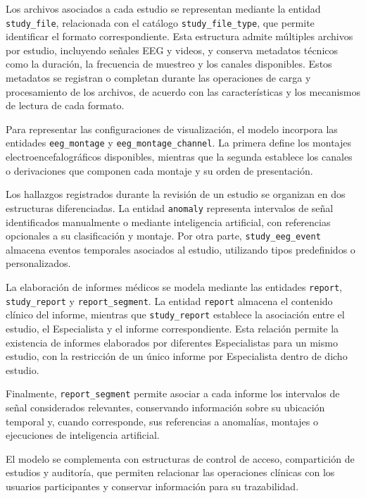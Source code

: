 Los archivos asociados a cada estudio se representan mediante la entidad
\texttt{study\_file}, relacionada con el catálogo
\texttt{study\_file\_type}, que permite identificar el formato
correspondiente. Esta estructura admite múltiples archivos por estudio,
incluyendo señales EEG y videos, y conserva metadatos técnicos como la
duración, la frecuencia de muestreo y los canales disponibles.
Estos metadatos se registran o completan durante las operaciones de carga
y procesamiento de los archivos, de acuerdo con las características y
los mecanismos de lectura de cada formato.

Para representar las configuraciones de visualización,
el modelo incorpora las entidades \texttt{eeg\_montage}
y \texttt{eeg\_montage\_channel}. La primera define los
montajes electroencefalográficos disponibles, mientras
que la segunda establece los canales o derivaciones
que componen cada montaje y su orden de presentación.

Los hallazgos registrados durante la revisión de un
estudio se organizan en dos estructuras diferenciadas.
La entidad \texttt{anomaly} representa intervalos de
señal identificados manualmente o mediante inteligencia
artificial, con referencias opcionales a su clasificación
y montaje. Por otra parte, \texttt{study\_eeg\_event}
almacena eventos temporales asociados al estudio,
utilizando tipos predefinidos o personalizados.


La elaboración de informes médicos se modela mediante las entidades \texttt{report}, \texttt{study\_report} y \texttt{report\_segment}. La entidad \texttt{report} almacena el contenido clínico del informe, mientras que \texttt{study\_report} establece la asociación entre el estudio, el Especialista y el informe correspondiente. Esta relación permite la existencia de informes elaborados por diferentes Especialistas para un mismo estudio, con la restricción de un único informe por Especialista dentro de dicho estudio.


Finalmente, \texttt{report\_segment} permite asociar
a cada informe los intervalos de señal considerados
relevantes, conservando información sobre su ubicación
temporal y, cuando corresponde, sus referencias a
anomalías, montajes o ejecuciones de inteligencia
artificial.

El modelo se complementa con estructuras de control
de acceso, compartición de estudios y auditoría,
que permiten relacionar las operaciones clínicas con
los usuarios participantes y conservar información
para su trazabilidad.


